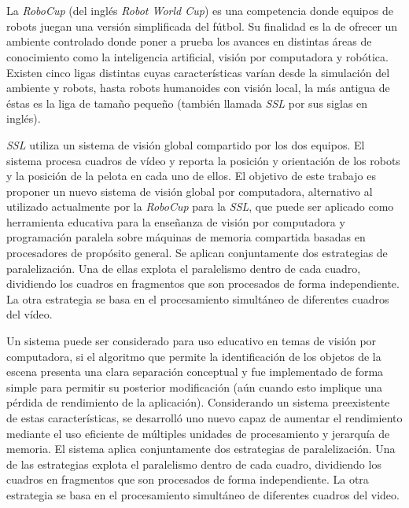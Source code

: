 \ \\
\ \\
\label{pagresum}
\\
\ \\
\ \\

\ \\

\ \\

La \emph{RoboCup} (del inglés \emph{Robot World Cup}) es una competencia donde
equipos de robots juegan una versión simplificada del fútbol. Su finalidad es
la de ofrecer un ambiente controlado donde poner a prueba los avances en
distintas áreas de conocimiento como la inteligencia artificial, visión por
computadora y robótica. Existen cinco ligas distintas cuyas características
varían desde la simulación del ambiente y robots, hasta robots humanoides con
visión local, la más antigua de éstas es la liga de tamaño pequeño (también
llamada \emph{SSL} por sus siglas en inglés).

\emph{SSL} utiliza un sistema de visión global compartido por los dos equipos.
El sistema procesa cuadros de vídeo y reporta la posición y orientación de los
robots y la posición de la pelota en cada uno de ellos. El objetivo de este
trabajo es proponer un nuevo sistema de visión global por computadora,
alternativo al utilizado actualmente por la \emph{RoboCup} para la \emph{SSL},
que puede ser aplicado como herramienta educativa para la enseñanza de visión
por computadora y programación paralela sobre máquinas de memoria compartida
basadas en procesadores de propósito general. Se aplican conjuntamente dos
estrategias de paralelización. Una de ellas explota el paralelismo dentro de
cada cuadro, dividiendo los cuadros en fragmentos que son procesados de forma
independiente. La otra estrategia se basa en el procesamiento simultáneo de
diferentes cuadros del vídeo.

Un sistema puede ser considerado para uso educativo en temas de visión por
computadora, si el algoritmo que permite la identificación de los objetos de la
escena presenta una clara separación conceptual y fue implementado de forma
simple para permitir su posterior modificación (aún cuando esto implique una
pérdida de rendimiento de la aplicación). Considerando un sistema preexistente
de estas características, se desarrolló uno nuevo capaz de aumentar el
rendimiento mediante el uso eficiente de múltiples unidades de procesamiento y
jerarquía de memoria. El sistema aplica conjuntamente dos estrategias de
paralelización. Una de las estrategias explota el paralelismo dentro de cada
cuadro, dividiendo los cuadros en fragmentos que son procesados de forma
independiente. La otra estrategia se basa en el procesamiento simultáneo de
diferentes cuadros del video.

